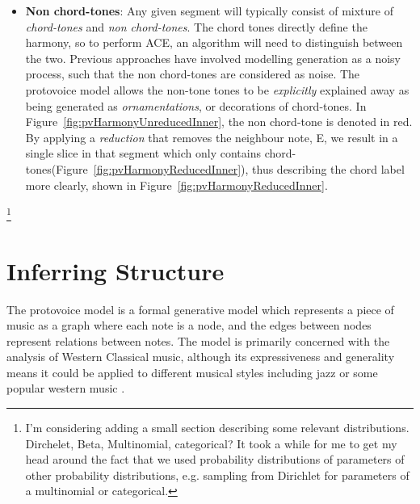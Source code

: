 \documentclass[12pt,a4paper,twoside,openright]{report} \usepackage[pdfborder={0 0 0}]{hyperref}    %
\theoremstyle{definition} \newtheorem{definition}{Definition}[section]
\begin{document}
\begin{itemize}
\item \textbf{Non chord-tones}: Any given segment will typically consist of mixture of \textit{chord-tones} and
  \textit{non chord-tones}. The chord tones directly define the harmony, so to perform ACE, an algorithm will need to
  distinguish between the two. Previous approaches have involved modelling generation as a noisy process, such that the
  non chord-tones are considered as noise\cite{temperleyAlgorithmHarmonicAnalysis1997}. The protovoice model allows the
  non-tone tones to be \textit{explicitly} explained away as being generated as \textit{ornamentations}, or decorations
  of chord-tones. In Figure~\ref{fig:pvHarmonyUnreducedInner}, the non chord-tone is denoted in red. By applying
  a \textit{reduction} that removes the neighbour note, E, we result in a single slice in that segment which only
  contains chord-tones(Figure~\ref{fig:pvHarmonyReducedInner}), thus describing the chord label more clearly, shown in
  Figure~\ref{fig:pvHarmonyReducedInner}. \end{itemize}



%
%
%
%
%
%

  \footnote{I'm considering adding a small section describing some relevant distributions. Dirchelet, Beta, Multinomial,
  categorical? It took a while for me to get my head around the fact that we used probability distributions of
parameters of other probability distributions, e.g. sampling from Dirichlet for parameters of a multinomial or
categorical.}

\section{Inferring Structure}


The protovoice model is a formal generative model which represents a piece of music as a graph where each note is
a node, and the edges between nodes represent relations between notes. The model is primarily concerned with the
analysis of Western Classical music, although its expressiveness and generality means it could be applied to different
musical styles including jazz or some popular western music \cite{finkensiepStructureFreePolyphony2023}. 
\end{document}
